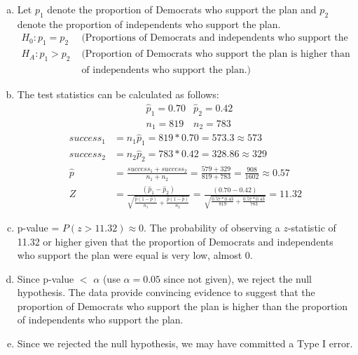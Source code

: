 {
\begin{enumerate}[(a)]

\item Let $p_1$ denote the proportion of Democrats who support the plan and $p_2$ denote the proportion of independents who support the plan.
\begin{align*}
H_0: p_1 = p_2 &\text{ (Proportions of Democrats and independents who support the plan are equal.)} \\
H_A: p _1 > p_2 &\text{ (Proportion of Democrats who support the plan is higher than the proportion } \\
&\text{ of independents who support the plan.)}
\end{align*}

\item The test statistics can be calculated as follows:
\begin{align*}
&\hat{p}_1 = 0.70	&\hat{p}_2 = 0.42 \\
&n_1 = 819		&n_2 = 783
\end{align*}
\begin{align*}
success_1 &= n_1 \hat{p}_1 = 819 * 0.70 = 573.3 \approx 573 \\
success_2 &= n_2 \hat{p}_2 = 783 * 0.42 = 328.86 \approx 329 \\
\hat{p} &= \frac{success_1 + success_2}{n_1 + n_2} = \frac{579 + 329}{819 + 783} = \frac{908}{1602} \approx 0.57 \\
Z &= \frac{(\hat{p}_1 - \hat{p}_2)}{\sqrt{\frac{\hat{p} (1 - \hat{p})}{n_1} + \frac{\hat{p} (1 - \hat{p})}{n_2}}} = \frac{(0.70 - 0.42)}{\sqrt{\frac{0.57 * 0.43}{819} + \frac{0.57 * 0.43}{783}}} = 11.32
\end{align*}

\item p-value = $P(z > 11.32) \approx 0$. The probability of observing a $z$-statistic of 11.32 or higher given that the proportion of Democrats and independents who support the plan were equal is very low, almost 0.

\item Since p-value $<$ $\alpha$ (use $\alpha = 0.05$ since not given), we reject the null hypothesis. The data provide convincing evidence to suggest that the proportion of Democrats who support the plan is higher than the proportion of independents who support the plan.

\item Since we rejected the null hypothesis, we may have committed a Type I error.


\end{enumerate}}
